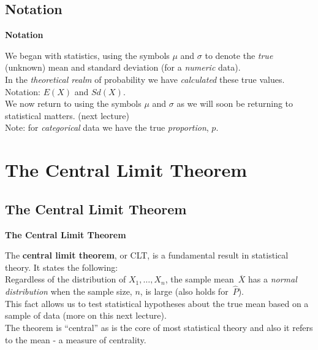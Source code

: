 \documentclass[compress]{beamer}        %
\makeatletter
\newcommand{\tcb}{\textcolor{beamer@blendedblue}}
\makeatother
\begin{document}
\subsection{Notation}
\begin{frame}{\bf \tcb{Notation}}

We began with statistics, using the symbols $\mu$ and $\sigma$ to denote the \emph{true} (unknown) mean and standard deviation (for a \emph{numeric} data).\\[1cm]

In the \emph{theoretical realm} of probability we have \emph{calculated} these true values. Notation: $E(X)$ and $Sd(X)$.\\[1cm]

We now return to using the symbols $\mu$ and $\sigma$ as we will soon be returning to statistical matters. {\footnotesize(next lecture)}\\[1cm]

Note: for \emph{categorical} data we have the true \emph{proportion}, $p$.


\end{frame}







\section{The Central Limit Theorem}
\subsection{The Central Limit Theorem}
\begin{frame}{\bf \tcb{The Central Limit Theorem}}

The {\bf central limit theorem}, or CLT, is a fundamental result in statistical theory. It states the following:\\[0.5cm]

Regardless of the distribution of $X_1,\ldots,X_n$, the sample mean $\,\overline{\!X}$ has a \emph{normal distribution} when the sample size, $n$, is large (also holds for $\,\widehat{\!P}$).\\[1cm]

This fact allows us to test statistical hypotheses about the true mean based on a sample of data (more on this next lecture).\\[1cm]

The theorem is ``central'' as is the core of most statistical theory and also it refers to the mean - a measure of centrality.

\end{frame}
\end{document}
